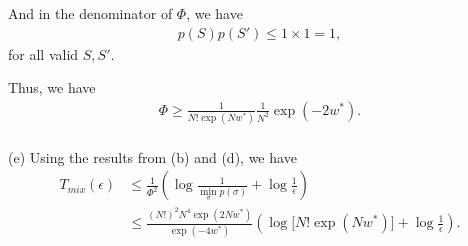 \documentclass{article}
\newcommand{\qeds}{\hfill\qedsymbol}
\begin{document}
And in the denominator of $\Phi$, we have
\begin{align*}
p(S)p(S') \leq 1 \times 1 = 1,
\end{align*} for all valid $S, S'$.

Thus, we have
\begin{align*}
	\Phi \geq \frac{1}{N!\exp\left(Nw^*\right)}\frac{1}{N^2}\exp(-2w^*).
\end{align*}\qeds
\\

\noindent
(e) Using the results from (b) and (d), we have
\begin{align*}
	T_{mix}(\epsilon) &\leq \frac{1}{\Phi^2}\left(\log\frac{1}{\min_\sigma p (\sigma)} + \log\frac{1}{\epsilon}\right)\\
	&\leq \frac{(N!)^2 N^4 \exp(2Nw^*)}{\exp(-4w^*)}\left(\log\big[N!\exp(N w^*)\big] + \log\frac{1}{\epsilon}\right).
\end{align*}
\end{document}

